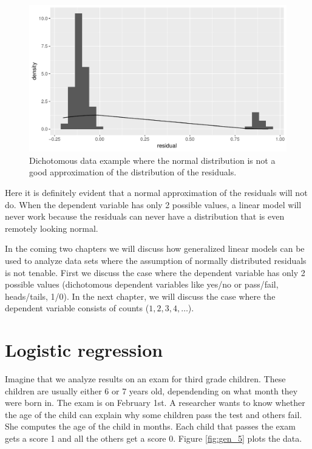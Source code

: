 \documentclass[]{book}\usepackage[]{graphicx}\usepackage[]{color}
\makeatletter
\def\maxwidth{ %
  \ifdim\Gin@nat@width>\linewidth
    \linewidth
  \else
    \Gin@nat@width
  \fi
}
\newenvironment{knitrout}{}{} %
\makeatother
\begin{document}
\begin{knitrout}
\color{fgcolor}\begin{figure}

{\centering \includegraphics[width=\maxwidth]{figure/gen_4-1} 

}

\caption[Dichotomous data example where the normal distribution is not a good approximation of the distribution of the residuals]{Dichotomous data example where the normal distribution is not a good approximation of the distribution of the residuals.}\label{fig:gen_4}
\end{figure}


\end{knitrout}
% 
% 
Here it is definitely evident that a normal approximation of the residuals will not do. When the dependent variable has only 2 possible values, a linear model will never work because the residuals can never have a distribution that is even remotely looking normal.

In the coming two chapters we will discuss how generalized linear models can be used to analyze data sets where the assumption of normally distributed residuals is not tenable. First we discuss the case where the dependent variable has only 2 possible values (dichotomous dependent variables like yes/no or pass/fail, heads/tails, 1/0). In the next chapter, we will discuss the case where the dependent variable consists of counts ($1, 2, 3, 4, \dots$).


\section{Logistic regression}

Imagine that we analyze results on an exam for third grade children. These children are usually either 6 or 7 years old, dependending on what month they were born in. The exam is on February 1st. A researcher wants to know whether the age of the child can explain why some children pass the test and others fail. She computes the age of the child in months. Each child that passes the exam gets a score 1 and all the others get a score 0. Figure \ref{fig:gen_5} plots the data.
\end{document}
